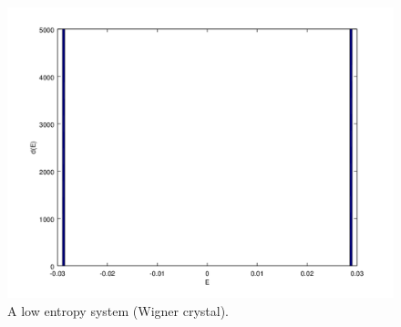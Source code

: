 \begin{figure}[htbp]
\begin{center}
\includegraphics[scale=.50]{splitDos.png}
\caption{A low entropy system (Wigner crystal).}
\label{crystalDoS}
\end{center}
\end{figure}

